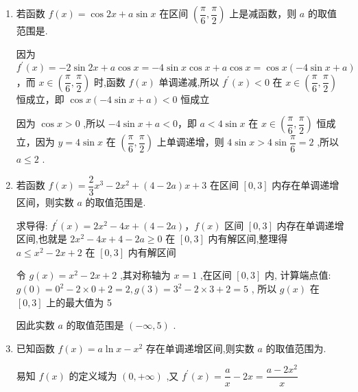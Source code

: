 \begin{enumerate}
\begin{jieda}
        故$a$ 的取值范围为 $\left( {-\infty , - 2\rbrack \cup \lbrack 1, + \infty }\right)$ .
    \end{jieda}

    \item 若函数 $f\left( x\right)  = \cos {2x} + a\sin x$ 在区间 $\left( {\dfrac{\pi }{6},\dfrac{\pi }{2}}\right)$ 上是减函数，则 $a$ 的取值范围是\blkda{$(-\infty, 2]$}.
    \begin{jieda}
        因为 ${f}^{\prime }\left( x\right)  =  - 2\sin {2x} + a\cos x =  - 4\sin x\cos x + a\cos x = \cos x\left( {-4\sin x + a}\right)$，而 $x \in  \left( {\dfrac{\pi }{6},\dfrac{\pi }{2}}\right)$ 时,函数 $f\left( x\right)$ 单调递减,所以 ${f}^{\prime }\left( x\right)  < 0$ 在 $x \in  \left( {\dfrac{\pi }{6},\dfrac{\pi }{2}}\right)$ 恒成立，即 $\cos x\left( {-4\sin x + a}\right)  < 0$ 恒成立
        
        因为 $\cos x > 0$ ,所以 $- 4\sin x + a < 0$，即 $a < 4\sin x$ 在 $x \in  \left( {\dfrac{\pi }{6},\dfrac{\pi }{2}}\right)$ 恒成立，因为 $y = 4\sin x$ 在 $\left( {\dfrac{\pi }{6},\dfrac{\pi }{2}}\right)$ 上单调递增，则 $4\sin x > 4\sin \dfrac{\pi }{6} = 2$ ,所以 $a \leq  2$ .
    \end{jieda}

    \item 若函数 $f\left( x\right)  = \dfrac{2}{3}{x}^{3} - 2{x}^{2} + \left( {4 - {2a}}\right) x + 3$ 在区间 $\left\lbrack  {0,3}\right\rbrack$ 内存在单调递增区间，则实数 $a$ 的取值范围是.
    \begin{jieda}
        求导得: ${f}^{\prime }\left( x\right)  = 2{x}^{2} - {4x} + \left( {4 - {2a}}\right)$，$f\left( x\right)$ 区间 $\left\lbrack  {0,3}\right\rbrack$ 内存在单调递增区间,也就是 $2{x}^{2} - {4x} + 4 - {2a} \geq 0$ 在 $\left\lbrack  {0,3}\right\rbrack$ 内有解区间,整理得$a \leq {x}^{2} - {2x} + 2$ 在 $\left\lbrack  {0,3}\right\rbrack$ 内有解区间
                
        令 $g\left( x\right)  = {x}^{2} - {2x} + 2$ ,其对称轴为 $x = 1$ ,在区间 $\left\lbrack  {0,3}\right\rbrack$ 内,
        计算端点值: $g\left( 0\right)  = {0}^{2} - 2 \times  0 + 2 = 2,g\left( 3\right)  = {3}^{2} - 2 \times  3 + 2 = 5$ ,
        所以 $g\left( x\right)$ 在 $\left\lbrack  {0,3}\right\rbrack$ 上的最大值为 5
        
        因此实数 $a$ 的取值范围是 $\left( {-\infty ,5}\right)$ .
    \end{jieda}

    \item 已知函数 $f\left( x\right)  = a\ln x - {x}^{2}$ 存在单调递增区间,则实数 $a$ 的取值范围为.
    \begin{jieda}
        易知 $f\left( x\right)$ 的定义域为 $\left( {0, + \infty }\right)$ ,又 ${f}^{\prime }\left( x\right)  = \dfrac{a}{x} - {2x} = \dfrac{a - 2{x}^{2}}{x}$ 
        

\end{jieda}
\end{enumerate}
